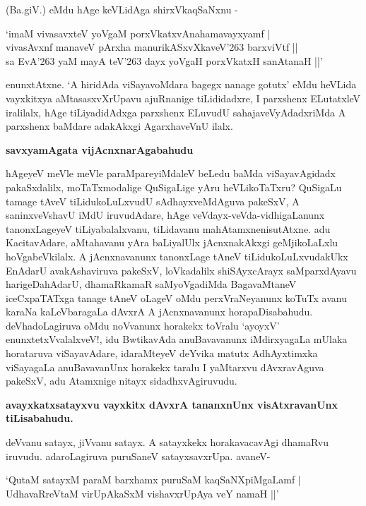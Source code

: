 (Ba.giV.) eMdu hAge keVLidAga shirxVkaqSaNxnu -

\begin{shloka}
`imaM vivasavxteV yoVgaM porxVkatxvAnahamavayxyamf |\\\label{107}
vivasAvxnf manaveV pArxha manurikASxvXkaveV\char'263 barxviVtf ||\\
sa EvA\char'263 yaM mayA teV\char'263 dayx yoVgaH porxVkatxH sanAtanaH ||'\label{107}
\end{shloka}

enunxtAtxne. `A hiridAda viSayavoMdara bagegx nanage gotutx' eMdu heVLida vayxkitxya aMtasasxvXrUpavu ajuRnanige tiLididadxre, I parxshenx ELutatxleV iralilalx, hAge tiLiyadidAdxga parxshenx ELuvudU sahajaveVyAdadxriMda A parxshenx baMdare adakAkxgi AgarxhaveVnU ilalx.

\noindent
\textbf{savxyamAgata vijAcnxnarAgabahudu}\label{page107}

hAgeyeV meVle meVle paraMpareyiMdaleV beLedu baMda viSayavAgidadx pakaSxdalilx, moTaTxmodalige QuSigaLige yAru heVLikoTaTxru? QuSigaLu tamage tAveV tiLidukoLuLxvudU sAdhayxveMdAguva pakeSxV, A saninxveVshavU iMdU iruvudAdare, hAge veVdayx-veVda-vidhigaLanunx tanonxLageyeV tiLiyabalalxvanu, tiLidavanu mahAtamxnenisutAtxne. adu KacitavAdare, aMtahavanu yAra baLiyalUlx jAcnxnakAkxgi geMjikoLaLxlu hoVgabeVkilalx. A jAcnxnavanunx tanonxLage tAneV tiLidukoLuLxvudakUkx EnAdarU avakAshaviruva pakeSxV, loVkadalilx shiSAyxcArayx saMparxdAyavu harigeDahAdarU, dhamaRkamaR saMyoVgadiMda BagavaMtaneV iceCxpaTATxga tanage tAneV oLageV oMdu perxVraNeyanunx koTuTx avanu karaNa kaLeVbaragaLa dAvxrA A jAcnxnavanunx horapaDisabahudu. deVhadoLagiruva oMdu noVvanunx horakekx toVralu `ayoyxV' enunxtetxVvalalxveV!, idu BwtikavAda anuBavavanunx iMdirxyagaLa mUlaka horataruva viSayavAdare, idaraMteyeV deYvika matutx AdhAyxtimxka viSayagaLa anuBavavanUnx horakekx taralu I yaMtarxvu dAvxravAguva pakeSxV, adu Atamxnige nitayx sidadhxvAgiruvudu.

\noindent
\textbf{avayxkatxsatayxvu vayxkitx dAvxrA tananxnUnx visAtxravanUnx tiLisabahudu.}\label{page108}

deVvanu satayx, jiVvanu satayx. A satayxkekx horakavacavAgi dhamaRvu iruvudu. adaroLagiruva puruSaneV satayxsavxrUpa. avaneV-

\begin{shloka}
`QutaM satayxM paraM barxhamx puruSaM kaqSaNXpiMgaLamf |\\\label{108}
UdhavaRreVtaM virUpAkaSxM vishavxrUpAya veY namaH ||'
\end{shloka}

